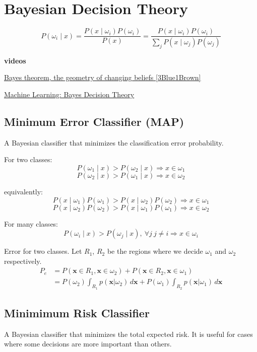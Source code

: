 \documentclass{report}
\begin{document}
\chapter{Bayesian Decision Theory}

\[P(\omega_i \mid x) = \frac{P(x \mid \omega_i) P(\omega_i)}{P(x)} = \frac{P(x \mid \omega_i) P(\omega_i)}{\sum\limits_j P(x \mid \omega_j) P(\omega_j)}\]

\begin{mdframed}
	\textbf{videos}

	\href{https://www.youtube.com/watch?v=HZGCoVF3YvM}{Bayes theorem, the geometry of changing beliefs [3Blue1Brown]}

	\href{https://www.youtube.com/watch?v=4JscUHGWaB4}{Machine Learning: Bayes Decision Theory}
\end{mdframed}

\section{Minimum Error Classifier (MAP)}
A Bayesian classifier that minimizes the classification error probability.

For two classes:
\[P(\omega_1 \mid x) > P(\omega_2 \mid x) \Rightarrow x \in \omega_1\]
\[P(\omega_2 \mid x) > P(\omega_1 \mid x) \Rightarrow x \in \omega_2\]

equivalently:
\[P(x \mid \omega_1)P(\omega_1) > P(x \mid \omega_2)P(\omega_2) \Rightarrow x \in \omega_1\]
\[P(x \mid \omega_2)P(\omega_2) > P(x \mid \omega_1)P(\omega_1) \Rightarrow x \in \omega_2\]

For many classes:
\[P(\omega_i \mid x) > P(\omega_j \mid x),\ \forall j\ j \neq i \Rightarrow x \in \omega_i\]

Error for two classes. Let $R_1$, $R_2$ be the regions where we decide $\omega_1$ and $\omega_2$ respectively.
\[\begin{split}
	P_e &= P(\symbf{x} \in R_1, \symbf{x} \in \omega_2) + P(\symbf{x} \in R_2, \symbf{x} \in \omega_1) \\
	&= P(\omega_2) \int_{R_1} p(\symbf{x}|\omega_2) \, d\symbf{x} + P(\omega_1) \int_{R_2} p(\symbf{x}|\omega_1) \, d\symbf{x}
\end{split}\]

\section{Minimimum Risk Classifier}
A Bayesian classifier that minimizes the total expected risk. It is useful for cases where some decisions are more important than others.
\end{document}
